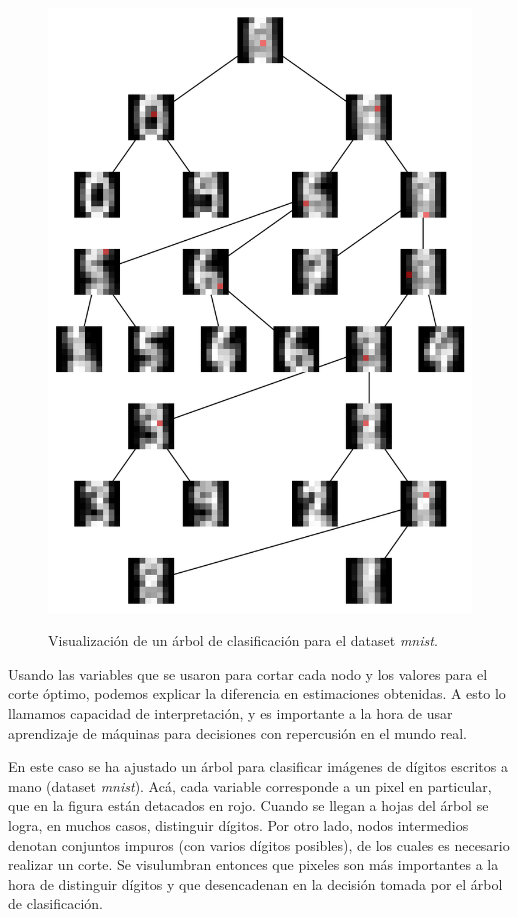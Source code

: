 \begin{figure}[h]
	\centering
	\includegraphics[width=\textwidth]{img/capN_interpretacion_arbol.png}\\
	\caption{Visualización de un árbol de clasificación para el dataset \textit{mnist}.}
\end{figure}

Usando las variables que se usaron para cortar cada nodo y los valores para el corte óptimo, podemos explicar la diferencia en estimaciones obtenidas. A esto lo llamamos capacidad de interpretación, y es importante a la hora de usar aprendizaje de máquinas para decisiones con repercusión en el mundo real.

En este caso se ha ajustado un árbol para clasificar imágenes de dígitos escritos a mano (dataset \textit{mnist}). Acá, cada variable corresponde a un pixel en particular, que en la figura están detacados en rojo. Cuando se llegan a hojas del árbol se logra, en muchos casos, distinguir dígitos. Por otro lado, nodos intermedios denotan conjuntos impuros (con varios dígitos posibles), de los cuales es necesario realizar un corte. Se visulumbran entonces que pixeles son más importantes a la hora de distinguir dígitos y que desencadenan en la decisión tomada por el árbol de clasificación.


